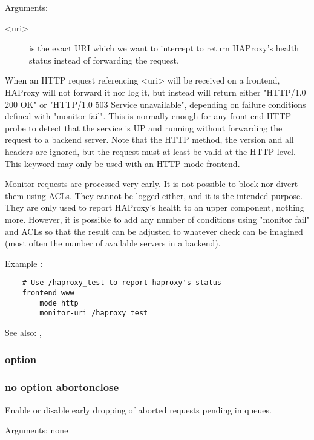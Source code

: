   Arguments:
\begin{description}
\item[<uri>]     is the exact URI which we want to intercept to return HAProxy's
              health status instead of forwarding the request.
\end{description}

  When an HTTP request referencing <uri> will be received on a frontend,
  HAProxy will not forward it nor log it, but instead will return either
  "HTTP/1.0 200 OK" or "HTTP/1.0 503 Service unavailable", depending on failure
  conditions defined with "monitor fail". This is normally enough for any
  front-end HTTP probe to detect that the service is UP and running without
  forwarding the request to a backend server. Note that the HTTP method, the
  version and all headers are ignored, but the request must at least be valid
  at the HTTP level. This keyword may only be used with an HTTP-mode frontend.

  Monitor requests are processed very early. It is not possible to block nor
  divert them using ACLs. They cannot be logged either, and it is the intended
  purpose. They are only used to report HAProxy's health to an upper component,
  nothing more. However, it is possible to add any number of conditions using
  "monitor fail" and ACLs so that the result can be adjusted to whatever check
  can be imagined (most often the number of available servers in a backend).

  Example :
\begin{verbatim}
    # Use /haproxy_test to report haproxy's status
    frontend www
        mode http
        monitor-uri /haproxy_test
\end{verbatim}

  See also: , 

\subsubsection[abortonclose]{option }
\subsubsection*{no option abortonclose}
  
  Enable or disable early dropping of aborted requests pending in queues.

   
  Arguments: none

